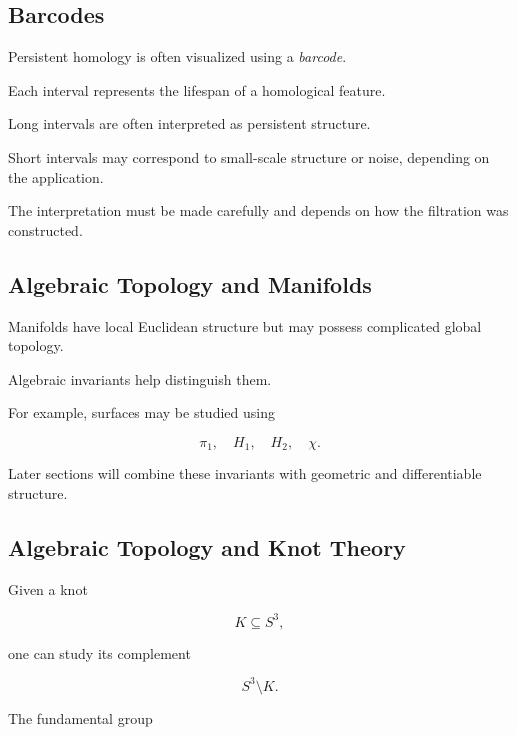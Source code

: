 \subsection{Barcodes}
\label{subsec:persistence-barcodes}

Persistent homology is often visualized using a \emph{barcode}.

Each interval represents the lifespan of a homological feature.

Long intervals are often interpreted as persistent structure.

Short intervals may correspond to small-scale structure or noise, depending
on the application.

The interpretation must be made carefully and depends on how the filtration
was constructed.

\subsection{Algebraic Topology and Manifolds}
\label{subsec:algebraic-topology-manifolds}

Manifolds have local Euclidean structure but may possess complicated global
topology.

Algebraic invariants help distinguish them.

For example, surfaces may be studied using

\[
\boxed{
\pi_1,
\quad
H_1,
\quad
H_2,
\quad
\chi.
}
\]

Later sections will combine these invariants with geometric and
differentiable structure.

\subsection{Algebraic Topology and Knot Theory}
\label{subsec:algebraic-topology-knots}

Given a knot

\[
K\subseteq S^3,
\]

one can study its complement

\[
\boxed{
S^3\setminus K.
}
\]

The fundamental group

